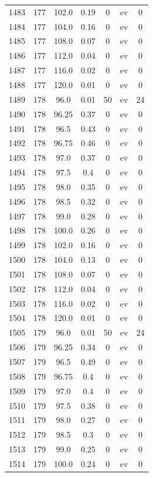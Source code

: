 \documentclass[12pt,a4paper]{article}
\begin{document}
\begin{tabular}{r|cccccc}
	1483 & 177 & 102.0 & 0.19 & 0 & ev & 0 \\
	1484 & 177 & 104.0 & 0.16 & 0 & ev & 0 \\
	1485 & 177 & 108.0 & 0.07 & 0 & ev & 0 \\
	1486 & 177 & 112.0 & 0.04 & 0 & ev & 0 \\
	1487 & 177 & 116.0 & 0.02 & 0 & ev & 0 \\
	1488 & 177 & 120.0 & 0.01 & 0 & ev & 0 \\
	1489 & 178 & 96.0 & 0.01 & 50 & ev & 24 \\
	1490 & 178 & 96.25 & 0.37 & 0 & ev & 0 \\
	1491 & 178 & 96.5 & 0.43 & 0 & ev & 0 \\
	1492 & 178 & 96.75 & 0.46 & 0 & ev & 0 \\
	1493 & 178 & 97.0 & 0.37 & 0 & ev & 0 \\
	1494 & 178 & 97.5 & 0.4 & 0 & ev & 0 \\
	1495 & 178 & 98.0 & 0.35 & 0 & ev & 0 \\
	1496 & 178 & 98.5 & 0.32 & 0 & ev & 0 \\
	1497 & 178 & 99.0 & 0.28 & 0 & ev & 0 \\
	1498 & 178 & 100.0 & 0.26 & 0 & ev & 0 \\
	1499 & 178 & 102.0 & 0.16 & 0 & ev & 0 \\
	1500 & 178 & 104.0 & 0.13 & 0 & ev & 0 \\
	1501 & 178 & 108.0 & 0.07 & 0 & ev & 0 \\
	1502 & 178 & 112.0 & 0.04 & 0 & ev & 0 \\
	1503 & 178 & 116.0 & 0.02 & 0 & ev & 0 \\
	1504 & 178 & 120.0 & 0.01 & 0 & ev & 0 \\
	1505 & 179 & 96.0 & 0.01 & 50 & ev & 24 \\
	1506 & 179 & 96.25 & 0.34 & 0 & ev & 0 \\
	1507 & 179 & 96.5 & 0.49 & 0 & ev & 0 \\
	1508 & 179 & 96.75 & 0.4 & 0 & ev & 0 \\
	1509 & 179 & 97.0 & 0.4 & 0 & ev & 0 \\
	1510 & 179 & 97.5 & 0.38 & 0 & ev & 0 \\
	1511 & 179 & 98.0 & 0.27 & 0 & ev & 0 \\
	1512 & 179 & 98.5 & 0.3 & 0 & ev & 0 \\
	1513 & 179 & 99.0 & 0.25 & 0 & ev & 0 \\
	1514 & 179 & 100.0 & 0.24 & 0 & ev & 0 \\

\end{tabular}
\end{document}
